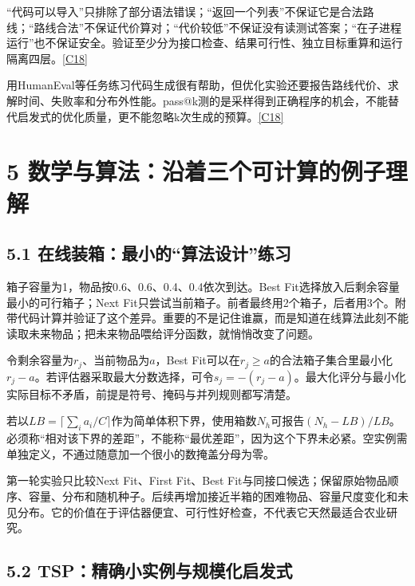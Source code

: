 ``代码可以导入''只排除了部分语法错误；``返回一个列表''不保证它是合法路线；``路线合法''不保证代价算对；``代价较低''不保证没有读测试答案；``在子进程运行''也不保证安全。验证至少分为接口检查、结果可行性、独立目标重算和运行隔离四层。\href{https://github.com/openai/human-eval}{{[}C18{]}}

用HumanEval等任务练习代码生成很有帮助，但优化实验还要报告路线代价、求解时间、失败率和分布外性能。pass@k测的是采样得到正确程序的机会，不能替代启发式的优化质量，更不能忽略k次生成的预算。\href{https://github.com/openai/human-eval}{{[}C18{]}}

\section{5
数学与算法：沿着三个可计算的例子理解}\label{ux6570ux5b66ux4e0eux7b97ux6cd5ux6cbfux7740ux4e09ux4e2aux53efux8ba1ux7b97ux7684ux4f8bux5b50ux7406ux89e3}

\subsection{5.1
在线装箱：最小的``算法设计''练习}\label{ux5728ux7ebfux88c5ux7bb1ux6700ux5c0fux7684ux7b97ux6cd5ux8bbeux8ba1ux7ec3ux4e60}

箱子容量为1，物品按0.6、0.6、0.4、0.4依次到达。Best
Fit选择放入后剩余容量最小的可行箱子；Next
Fit只尝试当前箱子。前者最终用2个箱子，后者用3个。附带代码计算并验证了这个差异。重要的不是记住谁赢，而是知道在线算法此刻不能读取未来物品；把未来物品喂给评分函数，就悄悄改变了问题。

令剩余容量为\(r_j\)、当前物品为\(a\)，Best
Fit可以在\(r_j\ge a\)的合法箱子集合里最小化\(r_j-a\)。若评估器采取最大分数选择，可令\(s_j=-(r_j-a)\)。最大化评分与最小化实际目标不矛盾，前提是符号、掩码与并列规则都写清楚。

若以\(LB=\lceil\sum_i a_i/C\rceil\)作为简单体积下界，使用箱数\(N_h\)可报告\((N_h-LB)/LB\)。必须称``相对该下界的差距''，不能称``最优差距''，因为这个下界未必紧。空实例需单独定义，不通过随意加一个很小的数掩盖分母为零。

第一轮实验只比较Next Fit、First Fit、Best
Fit与同接口候选；保留原始物品顺序、容量、分布和随机种子。后续再增加接近半箱的困难物品、容量尺度变化和未见分布。它的价值在于评估器便宜、可行性好检查，不代表它天然最适合农业研究。

\subsection{5.2
TSP：精确小实例与规模化启发式}\label{tspux7cbeux786eux5c0fux5b9eux4f8bux4e0eux89c4ux6a21ux5316ux542fux53d1ux5f0f}

